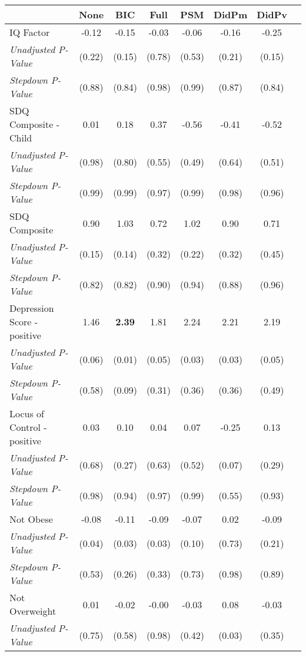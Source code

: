 \begin{tabular}{l c c c c c c c}
\toprule
 & None & BIC & Full & PSM & DidPm & DidPv \\
\midrule
IQ Factor & -0.12 & -0.15 & -0.03 & -0.06 & -0.16 & -0.25 \\
\quad \textit{Unadjusted P-Value} & (0.22) & (0.15) & (0.78) & (0.53) & (0.21) & (0.15) \\
\quad \textit{Stepdown P-Value} & (0.88) & (0.84) & (0.98) & (0.99) & (0.87) & (0.84) \\
SDQ Composite - Child & 0.01 & 0.18 & 0.37 & -0.56 & -0.41 & -0.52 \\
\quad \textit{Unadjusted P-Value} & (0.98) & (0.80) & (0.55) & (0.49) & (0.64) & (0.51) \\
\quad \textit{Stepdown P-Value} & (0.99) & (0.99) & (0.97) & (0.99) & (0.98) & (0.96) \\
SDQ Composite & 0.90 & 1.03 & 0.72 & 1.02 & 0.90 & 0.71 \\
\quad \textit{Unadjusted P-Value} & (0.15) & (0.14) & (0.32) & (0.22) & (0.32) & (0.45) \\
\quad \textit{Stepdown P-Value} & (0.82) & (0.82) & (0.90) & (0.94) & (0.88) & (0.96) \\
Depression Score - positive & 1.46 & \textbf{ 2.39 } & 1.81 & 2.24 & 2.21 & 2.19 \\
\quad \textit{Unadjusted P-Value} & (0.06) & (0.01) & (0.05) & (0.03) & (0.03) & (0.05) \\
\quad \textit{Stepdown P-Value} & (0.58) & (0.09) & (0.31) & (0.36) & (0.36) & (0.49) \\
Locus of Control - positive & 0.03 & 0.10 & 0.04 & 0.07 & -0.25 & 0.13 \\
\quad \textit{Unadjusted P-Value} & (0.68) & (0.27) & (0.63) & (0.52) & (0.07) & (0.29) \\
\quad \textit{Stepdown P-Value} & (0.98) & (0.94) & (0.97) & (0.99) & (0.55) & (0.93) \\
Not Obese & -0.08 & -0.11 & -0.09 & -0.07 & 0.02 & -0.09 \\
\quad \textit{Unadjusted P-Value} & (0.04) & (0.03) & (0.03) & (0.10) & (0.73) & (0.21) \\
\quad \textit{Stepdown P-Value} & (0.53) & (0.26) & (0.33) & (0.73) & (0.98) & (0.89) \\
Not Overweight & 0.01 & -0.02 & -0.00 & -0.03 & 0.08 & -0.03 \\
\quad \textit{Unadjusted P-Value} & (0.75) & (0.58) & (0.98) & (0.42) & (0.03) & (0.35) \\

\end{tabular}
